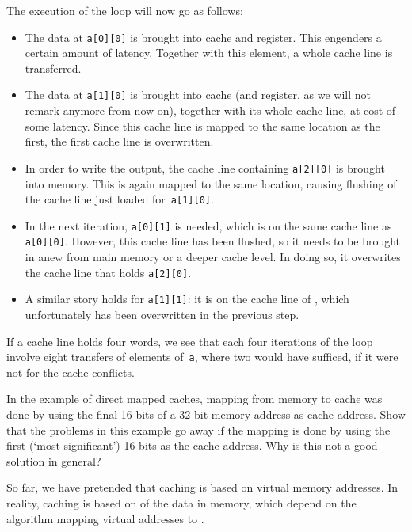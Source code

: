 The execution of the loop will now
go as follows:
\begin{itemize}
\item The data at \texttt{a[0][0]} is brought into cache and
  register. This engenders a certain amount of latency. Together with
  this element, a whole cache line is transferred.
\item The data at \texttt{a[1][0]} is brought into cache (and
  register, as we will not remark anymore from now on), together
  with its whole cache line, at cost of some latency. Since this cache
  line is mapped to the same location as the first, the first cache
  line is overwritten.
\item In order to write the output, the cache line containing
  \texttt{a[2][0]} is brought into memory. This is again mapped to the
  same location, causing flushing of the cache line just loaded
  for~\texttt{a[1][0]}.
\item In the next iteration, \texttt{a[0][1]} is needed, which is
  on the same cache line as \texttt{a[0][0]}. However, this cache line
  has been flushed, so it needs to be brought in anew from main memory
  or a deeper cache level. In doing so, it overwrites the cache line
  that holds \texttt{a[2][0]}.
\item A similar story holds for \texttt{a[1][1]}: it is on the cache
  line of , which unfortunately has been overwritten in
  the previous step.
\end{itemize}
If a cache line holds four words, we see that each four iterations of
the loop involve eight transfers of elements of~\texttt{a}, where two
would have sufficed, if it were not for the cache conflicts.

\begin{exercise}
  In the example of direct mapped caches, mapping from memory to cache
  was done by using the final 16 bits of a 32 bit memory address as
  cache address. Show that the problems in this example go away if the
  mapping is done by using the first (`most significant') 16 bits as
  the cache address. Why is this not a good solution in general?
\end{exercise}

\begin{remark}
  So far, we have pretended that caching is based on virtual memory
  addresses. In reality, caching is based on  of the data in memory, which depend on the algorithm
  mapping virtual addresses to .
\end{remark}

